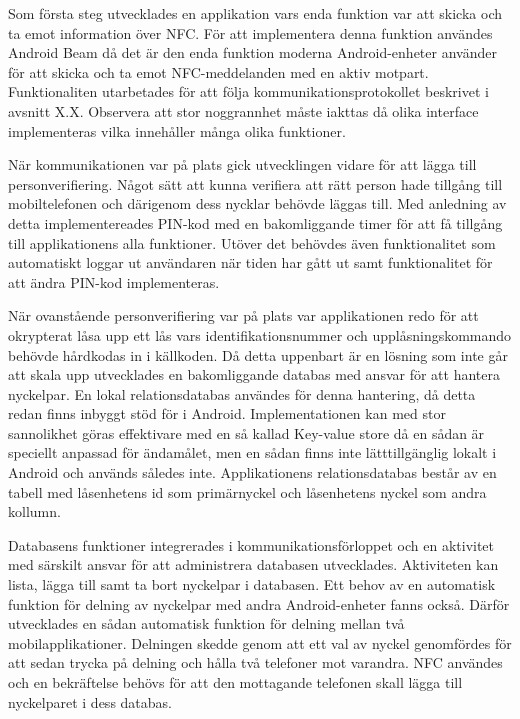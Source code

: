 \documentclass[11pt]{article}
\begin{document}
Som första steg utvecklades en applikation vars enda funktion var att skicka och ta emot information över NFC. För att implementera denna funktion användes Android Beam då det är den enda funktion moderna Android-enheter använder för att skicka och ta emot NFC-meddelanden med en aktiv motpart. Funktionaliten utarbetades för att följa kommunikationsprotokollet beskrivet i avsnitt X.X. Observera att stor noggrannhet måste iakttas då olika interface implementeras vilka innehåller många olika funktioner.

När kommunikationen var på plats gick utvecklingen vidare för att lägga till personverifiering. Något sätt att kunna verifiera att rätt person hade tillgång till mobiltelefonen och därigenom dess nycklar behövde läggas till. Med anledning av detta implementereades PIN-kod med en bakomliggande timer för att få tillgång till applikationens alla funktioner. Utöver det behövdes även funktionalitet som automatiskt loggar ut användaren när tiden har gått ut samt funktionalitet för att ändra PIN-kod implementeras.

När ovanstående personverifiering var på plats var applikationen redo för att okrypterat låsa upp ett lås vars identifikationsnummer och upplåsningskommando behövde hårdkodas in i källkoden. Då detta uppenbart är en lösning som inte går att skala upp utvecklades en bakomliggande databas med ansvar för att hantera nyckelpar. En lokal relationsdatabas användes för denna hantering, då detta redan finns inbyggt stöd för i Android.  Implementationen kan med stor sannolikhet göras effektivare med en så kallad Key-value store då en sådan är speciellt anpassad för ändamålet, men en sådan finns inte lätttillgänglig lokalt i Android och används således inte. Applikationens relationsdatabas består av en tabell med låsenhetens id som primärnyckel och låsenhetens nyckel som andra kollumn.

Databasens funktioner integrerades i kommunikationsförloppet och en aktivitet med särskilt ansvar för att administrera databasen utvecklades. Aktiviteten kan lista, lägga till samt ta bort nyckelpar i databasen. Ett behov av en automatisk funktion för delning av nyckelpar med andra Android-enheter fanns också. Därför utvecklades en sådan automatisk funktion för delning mellan två mobilapplikationer. Delningen skedde genom att ett val av nyckel genomfördes för att sedan trycka på delning och hålla två telefoner mot varandra. NFC användes och en bekräftelse behövs för att den mottagande telefonen skall lägga till nyckelparet i dess databas.
\end{document}
